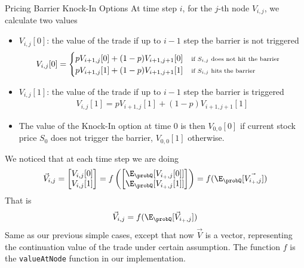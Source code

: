 \begin{frame}{Pricing Barrier Knock-In Options}
At time step $i$, for the $j$-th node $V_{i,j}$, we calculate two values
    \begin{itemize}
        \item $V_{i,j}[0]$: the value of the trade if up to $i-1$ step the barrier is not triggered
        \begin{align*}
            V_{i,j}[0] =
            \begin{cases}
                p V_{i+1, j}[0] + (1-p) V_{i+1, j+1}[0] ~~~\text{\scriptsize if $S_{i, j}$ does not hit the barrier}\\
                p V_{i+1, j}[1] + (1-p) V_{i+1, j+1}[1] ~~~\text{\scriptsize if $S_{i, j}$ hits the barrier}
            \end{cases}
        \end{align*}
        \item $V_{i,j}[1]$: the value of the trade if up to $i-1$ step the barrier is triggered
        \begin{align*}
            V_{i,j}[1] = p V_{i+1, j}[1] + (1-p) V_{i+1, j+1}[1]
        \end{align*}
        \item The value of the Knock-In option at time 0 is then $V_{0, 0}[0]$ if current stock price $S_0$ does not trigger the barrier, $V_{0, 0}[1]$ otherwise.
    \end{itemize}
\end{frame}

\begin{frame}[fragile]
We noticed that at each time step we are doing
\begin{align}
\vec{V}_{i, j} =
\begin{bmatrix}
V_{i, j}[0] \\
V_{i, j}[1]
\end{bmatrix} = f \left(
\begin{bmatrix}
\E_\probQ[V_{i_+, j}[0]] \\
\E_\probQ[V_{i_+, j}[1]]
\end{bmatrix}
\right) = f (\E_\probQ[\vec{V_{i_+, j}}])
\end{align}
That is
\begin{align*}
\vec{V}_{i, j} = f (\E_\probQ[\vec{V}_{i_+, j}])
\end{align*}
Same as our previous simple cases, except that now $\vec{V}$ is a vector, representing the continuation value of the trade under certain assumption.
\pause
\vfill
The function $f$ is the \verb+valueAtNode+ function in our implementation.
\end{frame}

